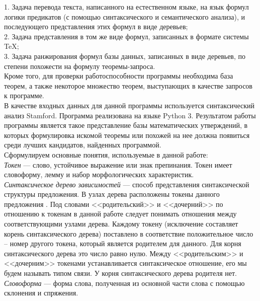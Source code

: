 \documentclass[12pt]{article}
\begin{document}
1. Задача перевода текста, написанного на естественном языке, на язык формул логики предикатов (с помощью синтаксического и семантического анализа), и последующего представления этих формул в виде деревьев; \\

2. Задача представления в том же виде формул, записанных в формате системы TeX; \\

3. Задача ранжирования формул базы данных, записанных в виде деревьев, по степени похожести  на  формулу  теоремы-запроса.  \\

Кроме того,  для  проверки работоспособности программы необходима база теорем, а также некоторое множество теорем, выступающих в качестве запросов к программе.\\

В качестве входных данных для данной программы используется синтаксический анализ Stamford. Программа реализована на языке Python 3. Результатом работы программы является такое представление базы математических утверждений, в которых формулировка искомой теоремы или похожей на нее должна появиться среди лучших кандидатов, найденных программой.\\

\newpage
Сформулируем основные понятия, используемые в данной работе: \\

\textit{Токен} —  слово, устойчивое выражение или знак препинания. Токен имеет словоформу, лемму и набор морфологических характеристик. \\

\textit{Синтаксическое дерево зависимостей} --- способ представления синтаксической структуры предложения. В узлах дерева расположены токены данного предложения \cite{Bolshakova}. Под словами <<родительский>> и <<дочерний>> по отношению к токенам в данной работе следует понимать отношения между соответствующими узлами дерева. Каждому токену (исключение составляет корень синтаксического дерева) поставлено в соответствие положительное число -- номер другого токена, который является родителем для данного. Для корня синтаксического дерева это число равно нулю. Между <<родительским>> и <<дочерним>> токенами устанавливается синтаксическое отношение, его мы будем называть типом связи. У корня синтаксического дерева родителя нет.\\

\textit{Словоформа} --- форма слова, полученная из основной части слова с помощью склонения и спряжения.\\
\end{document}
